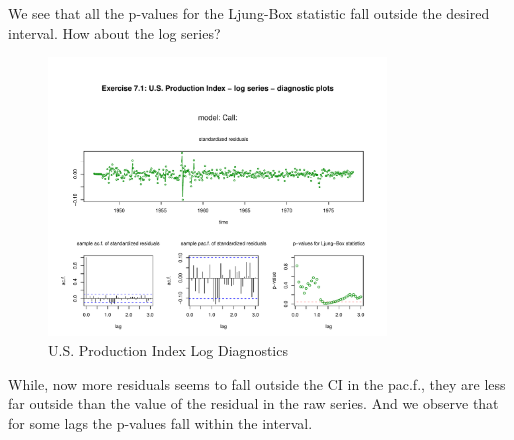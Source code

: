 We see that all the p-values for the Ljung-Box statistic fall outside the desired interval. How about the log series?

\begin{figure}[H]
\centering
\includegraphics[width=0.8\textwidth]{plots/UsProdLogDiag.pdf}
\caption{U.S. Production Index Log Diagnostics}
\end{figure}

While, now more residuals seems to fall outside the CI in the pac.f., they are less far outside than the value of the residual in the raw series. And we observe that for some lags the p-values fall within the interval. \\

